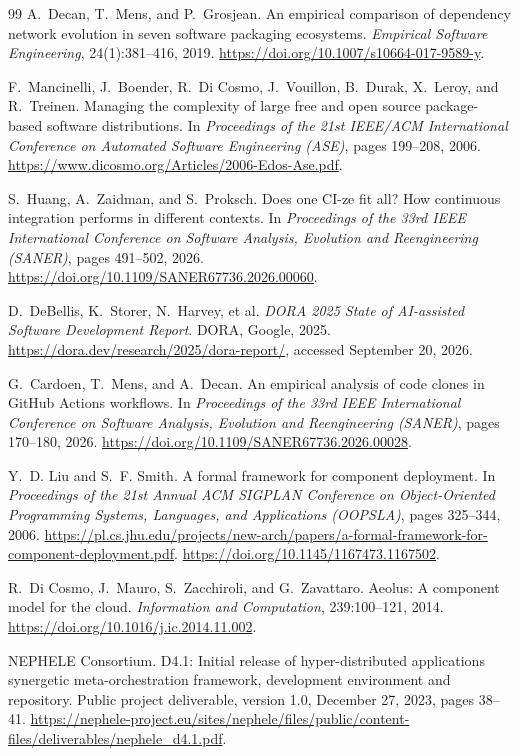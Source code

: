 \begin{thebibliography}{99}
A.~Decan, T.~Mens, and P.~Grosjean.
An empirical comparison of dependency network evolution in seven
software packaging ecosystems.
\emph{Empirical Software Engineering}, 24(1):381--416, 2019.
\url{https://doi.org/10.1007/s10664-017-9589-y}.

F.~Mancinelli, J.~Boender, R.~Di Cosmo, J.~Vouillon, B.~Durak,
X.~Leroy, and R.~Treinen.
Managing the complexity of large free and open source package-based
software distributions.
In \emph{Proceedings of the 21st IEEE/ACM International Conference on
Automated Software Engineering (ASE)}, pages 199--208, 2006.
\url{https://www.dicosmo.org/Articles/2006-Edos-Ase.pdf}.

S.~Huang, A.~Zaidman, and S.~Proksch.
Does one CI-ze fit all? How continuous integration performs in different
contexts.
In \emph{Proceedings of the 33rd IEEE International Conference on Software
Analysis, Evolution and Reengineering (SANER)}, pages 491--502, 2026.
\url{https://doi.org/10.1109/SANER67736.2026.00060}.

D.~DeBellis, K.~Storer, N.~Harvey, et al.
\emph{DORA 2025 State of AI-assisted Software Development Report}.
DORA, Google, 2025.
\url{https://dora.dev/research/2025/dora-report/}, accessed September 20, 2026.

G.~Cardoen, T.~Mens, and A.~Decan.
An empirical analysis of code clones in GitHub Actions workflows.
In \emph{Proceedings of the 33rd IEEE International Conference on Software
Analysis, Evolution and Reengineering (SANER)}, pages 170--180, 2026.
\url{https://doi.org/10.1109/SANER67736.2026.00028}.

Y.~D. Liu and S.~F. Smith.
A formal framework for component deployment.
In \emph{Proceedings of the 21st Annual ACM SIGPLAN Conference on
Object-Oriented Programming Systems, Languages, and Applications (OOPSLA)},
pages 325--344, 2006.
\url{https://pl.cs.jhu.edu/projects/new-arch/papers/a-formal-framework-for-component-deployment.pdf}.
\url{https://doi.org/10.1145/1167473.1167502}.

R.~Di Cosmo, J.~Mauro, S.~Zacchiroli, and G.~Zavattaro.
Aeolus: A component model for the cloud.
\emph{Information and Computation}, 239:100--121, 2014.
\url{https://doi.org/10.1016/j.ic.2014.11.002}.

NEPHELE Consortium.
D4.1: Initial release of hyper-distributed applications synergetic
meta-orchestration framework, development environment and repository.
Public project deliverable, version 1.0, December 27, 2023, pages 38--41.
\url{https://nephele-project.eu/sites/nephele/files/public/content-files/deliverables/nephele_d4.1.pdf}.


\end{thebibliography}
